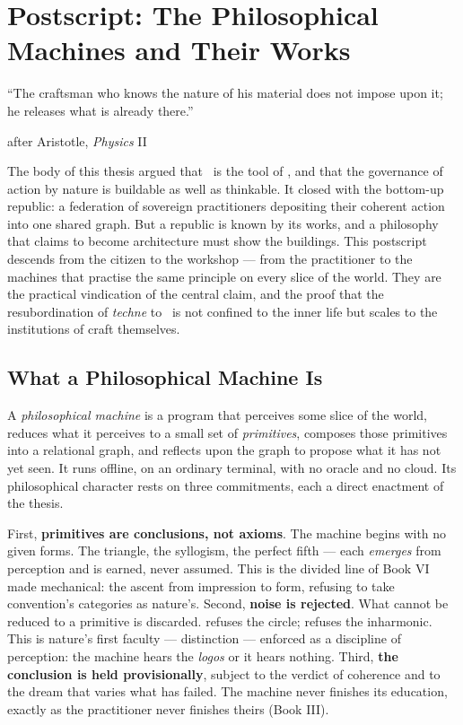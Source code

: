 \chapter*{Postscript: The Philosophical Machines and Their Works}

\epigraph{``The craftsman who knows the nature of his material does not impose
upon it; he releases what is already there.''}{after Aristotle, \emph{Physics} II}

The body of this thesis argued that \praxis\ is the tool of \physis, and that the
governance of action by nature is buildable as well as thinkable. It closed with
the bottom-up republic: a federation of sovereign practitioners depositing their
coherent action into one shared graph. But a republic is known by its works, and
a philosophy that claims to become architecture must show the buildings. This
postscript descends from the citizen to the workshop --- from the practitioner to
the machines that practise the same principle on every slice of the world. They
are the practical vindication of the central claim, and the proof that the
resubordination of \emph{techne} to \physis\ is not confined to the inner life
but scales to the institutions of craft themselves.

\section*{What a Philosophical Machine Is}

A \emph{philosophical machine} is a program that perceives some slice of the
world, reduces what it perceives to a small set of \emph{primitives}, composes
those primitives into a relational graph, and reflects upon the graph to propose
what it has not yet seen. It runs offline, on an ordinary terminal, with no
oracle and no cloud. Its philosophical character rests on three commitments, each
a direct enactment of the thesis.

First, \textbf{primitives are conclusions, not axioms}. The machine begins with
no given forms. The triangle, the syllogism, the perfect fifth --- each
\emph{emerges} from perception and is earned, never assumed. This is the divided
line of Book VI made mechanical: the ascent from impression to form, refusing to
take convention's categories as nature's. Second, \textbf{noise is rejected}.
What cannot be reduced to a primitive is discarded.  refuses the
circle;  refuses the inharmonic. This is nature's first
faculty --- distinction --- enforced as a discipline of perception: the machine
hears the \emph{logos} or it hears nothing. Third, \textbf{the conclusion is
held provisionally}, subject to the verdict of coherence and to the dream that
varies what has failed. The machine never finishes its education, exactly as the
practitioner never finishes theirs (Book III).

